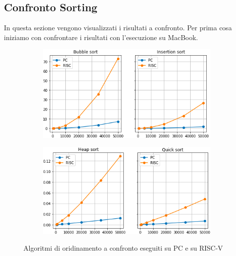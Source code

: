 \documentclass[12pt,a4paper]{report}
\begin{document}
\subsection{Confronto Sorting}
In questa sezione vengono visualizzati i risultati a confronto. Per prima cosa iniziamo con confrontare i risultati con l'esecuzione su MacBook.

\begin{figure}[htbp]
     \centering
     \begin{subfigure}[t]{0.49\textwidth}
         \centering
         \includegraphics[width=\textwidth]{Img/GraficiSorting/BubbleInsert.png}
       
     \end{subfigure}
     \hfill
     \begin{subfigure}[t]{0.49\textwidth}
         \centering
         \includegraphics[width=\textwidth]{Img/GraficiSorting/HeapQuick.png}
        
     \end{subfigure}

   \caption{Algoritmi di oridinamento a confronto eseguiti su PC e su RISC-V}
   \label{Fig:AllSort_PC}
\end{figure}
	
\end{document}
